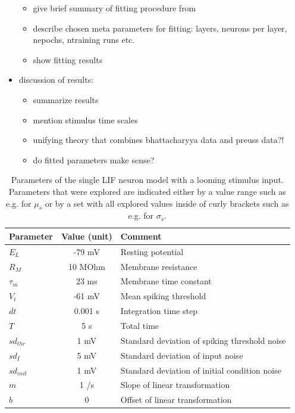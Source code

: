 \documentclass[a4paper,10pt,hidelinks]{scrreprt}
\begin{document}
\begin{itemize}
\begin{itemize}
			\item give brief summary of fitting procedure from \cite{Lueckmann2018}
			\item describe chosen meta parameters for fitting: layers, neurons per layer, nepochs, 
			ntraining runs etc.
			\item show fitting results
		\end{itemize}
		\item discussion of results:
		\begin{itemize}
			\item summarize results
			\item mention stimulus time scales
			\item unifying theory that combines bhattacharyya data and preuss data?!
			\item do fitted parameters make sense?
		\end{itemize}
	\end{itemize}
	\begin{table} [!th]
		\begin{center}
			\begin{tabular}{l|c|p{7cm}}
				\textbf{Parameter} & \textbf{Value (unit)} & \textbf{Comment} \\
				\hline
				$E_L$ & -79 mV & Resting potential\\
				$R_M$ & 10 MOhm & Membrane resistance\\
				$\tau_{m}$ & 23 ms & Membrane time constant\\
				$V_t$ & -61 mV & Mean spiking threshold\\
				$dt$ & 0.001 s & Integration time step\\
				$T$ & 5 s & Total time\\
				$sd_{thr}$ & 1 mV & Standard deviation of spiking threshold noise\\
				$sd_{I}$ & 5 mV & Standard deviation of input noise\\
				$sd_{init}$ & 1 mV & Standard deviation of initial condition noise\\
				$m$ & 1 \textdegree/s  & Slope of linear transformation\\
				$b$ & 0 \textdegree & Offset of linear transformation\\
			\end{tabular}
		\end{center}
		\caption{Parameters of the single LIF neuron model with a looming stimulus input. Parameters that were explored are indicated either by a value range such as e.g. for $\mu_s$ or by a set with all explored values inside of curly brackets such as e.g. for $\sigma_s$.}
		\label{tab:neuroparams}
	\end{table}
\end{document}
